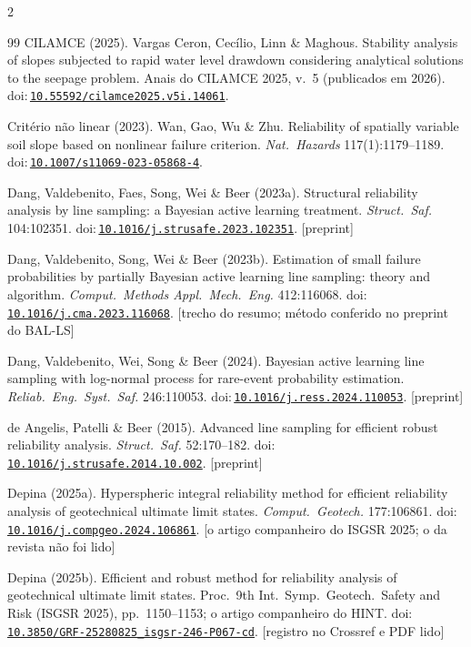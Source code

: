 \documentclass[11pt,a4paper]{article}
\newcommand{\doi}[1]{doi:\,\href{https://doi.org/#1}{\nolinkurl{#1}}}
\begin{document}
\begin{multicols}{2}
\begin{thebibliography}{99}
 CILAMCE (2025). Vargas Ceron, Cecílio, Linn \& Maghous. Stability analysis of
slopes subjected to rapid water level drawdown considering analytical solutions to the seepage problem. Anais do CILAMCE
2025, v.~5 (publicados em 2026). \doi{10.55592/cilamce2025.v5i.14061}.

 Critério não linear (2023). Wan, Gao, Wu \& Zhu. Reliability of
spatially variable soil slope based on nonlinear failure criterion. \emph{Nat.\ Hazards} 117(1):1179--1189.
\doi{10.1007/s11069-023-05868-4}.

 Dang, Valdebenito, Faes, Song, Wei \& Beer (2023a). Structural reliability
analysis by line sampling: a Bayesian active learning treatment. \emph{Struct.\ Saf.} 104:102351.
\doi{10.1016/j.strusafe.2023.102351}. [preprint]

 Dang, Valdebenito, Song, Wei \& Beer (2023b). Estimation of small failure
probabilities by partially Bayesian active learning line sampling: theory and algorithm. \emph{Comput.\ Methods Appl.\
Mech.\ Eng.} 412:116068. \doi{10.1016/j.cma.2023.116068}. [trecho do resumo; método conferido no preprint do BAL-LS]

 Dang, Valdebenito, Wei, Song \& Beer (2024). Bayesian active learning line
sampling with log-normal process for rare-event probability estimation. \emph{Reliab.\ Eng.\ Syst.\ Saf.} 246:110053.
\doi{10.1016/j.ress.2024.110053}. [preprint]

 de Angelis, Patelli \& Beer (2015). Advanced line sampling for
efficient robust reliability analysis. \emph{Struct.\ Saf.} 52:170--182. \doi{10.1016/j.strusafe.2014.10.002}.
[preprint]

 Depina (2025a). Hyperspheric integral reliability method for efficient reliability
analysis of geotechnical ultimate limit states. \emph{Comput.\ Geotech.} 177:106861.
\doi{10.1016/j.compgeo.2024.106861}. [o artigo companheiro do ISGSR 2025; o da revista não foi lido]

 Depina (2025b). Efficient and robust method for reliability analysis of
geotechnical ultimate limit states. Proc.\ 9th Int.\ Symp.\ Geotech.\ Safety and Risk (ISGSR 2025), pp.\ 1150--1153;
o artigo companheiro do HINT. \doi{10.3850/GRF-25280825_isgsr-246-P067-cd}. [registro no Crossref e PDF lido]


\end{thebibliography}
\end{multicols}
\end{document}
